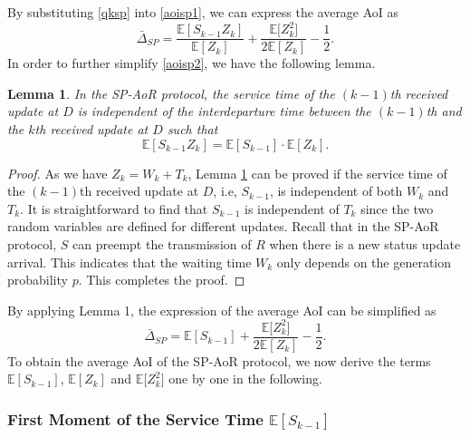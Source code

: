 \documentclass{IEEEtran}
\newtheorem{lemma}{Lemma}
\begin{document}
\noindent By substituting \eqref{qksp} into \eqref{aoisp1}, we can express the average AoI as 	
\begin{equation}\label{aoisp2}
\bar{\Delta}_{SP}=\frac{\mathbb{E}[S_{k-1}Z_{k}]}{\mathbb{E}[Z_{k}]}+\frac{\mathbb{E}\big[Z_k^2\big]}{2\mathbb{E}[Z_{k}]}-\frac{1}{2}.
\end{equation}
In order to further simplify \eqref{aoisp2}, we have the following lemma.

\begin{lemma} \label{lemma1}
	{In the SP-AoR protocol, the service time of the $(k-1)$th   received update at $D$ is independent of the interdeparture time between the $(k-1)$th and the $k$th received update at $D$ such that
		\begin{equation}
		\mathbb{E}[S_{k-1}Z_{k}]=\mathbb{E}[S_{k-1}]\cdot \mathbb{E}[Z_{k}].
		\end{equation}}
\end{lemma}

\begin{proof}
	As we have $Z_k=W_k+T_k$, Lemma \ref{lemma1} can be proved if the service time of the $(k-1)$th received update at $D$, i.e, $S_{k-1}$,  is independent of both $W_k$ and $T_k$. It is straightforward to find that $S_{k-1}$ is independent of $T_k$ since the two random variables are defined for different updates. Recall that in the SP-AoR protocol, $S$ can preempt the transmission of $R$ when there is a new status update arrival. This indicates that the waiting time $W_k$ only depends on the generation probability $p$. This completes the proof.
\end{proof}



\noindent By applying Lemma 1, the expression of the average AoI can be simplified as
\vspace{-0.1cm}
\begin{equation}\label{aoisp3}
\bar{\Delta}_{SP}=\mathbb{E}[S_{k-1}]+\frac{\mathbb{E}\big[Z_{k}^2\big]}{2\mathbb{E}[Z_{k}]}-\frac{1}{2}.
\end{equation}
To obtain the average AoI of the SP-AoR protocol, we now derive the terms $\mathbb{E}[S_{k-1}]$, $\mathbb{E}[Z_{k}]$ and $\mathbb{E}\big[Z_{k}^2\big]$ one by one in the following. 

\subsubsection{First Moment of the Service Time $\mathbb{E}[S_{k-1}]$}
\end{document}
